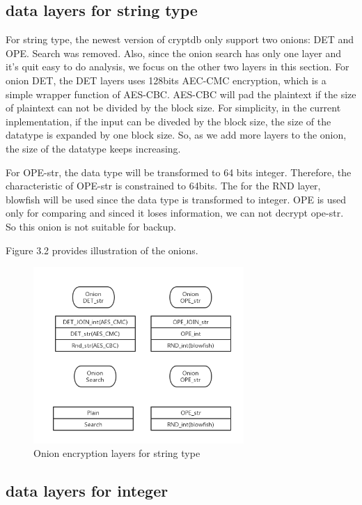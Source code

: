 \subsection{data layers for string type}

For string type, the newest version of cryptdb only support two onions: DET and OPE. Search was removed. Also, since the onion search has only one layer and it's quit easy to do analysis, we focus on the other two layers
in this section. For onion DET, the DET layers uses 128bits AEC-CMC encryption, which is a simple wrapper function of AES-CBC. AES-CBC will pad the plaintext if the size of plaintext can not be divided by the block size. For simplicity, in the current inplementation, if the input can be diveded by the block size, the size of the datatype is expanded by one block size. So, as we add more layers to the onion, the size of the datatype keeps increasing. 

For OPE-str, the data type will be transformed to 64 bits integer. Therefore, the characteristic of OPE-str is constrained to 64bits. The for the RND layer, blowfish will be used since the data type is transformed to integer. OPE is used only for comparing and sinced it loses information, we can not decrypt ope-str. So this onion is not suitable for backup. 

Figure 3.2 provides illustration of the onions. 



\begin{figure}[tb]
\centering
\includegraphics[width=8cm]{Onion_str.png}
\caption{Onion encryption layers for string type}
\label{fig:stack}
\end{figure}




\subsection{data layers for integer}


